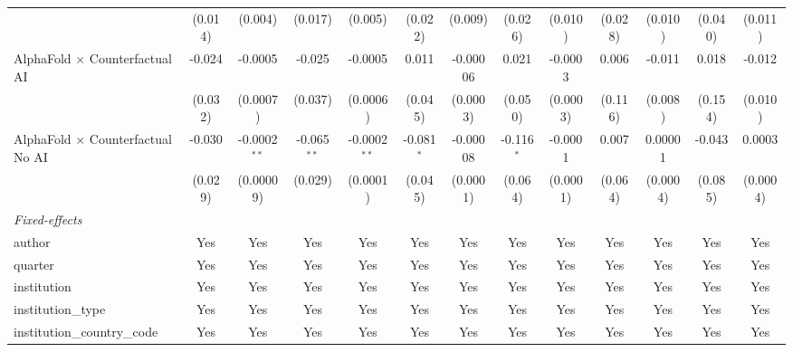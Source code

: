 \begin{tabular}{lcccccccccccc}
                                            & (0.014)       & (0.004)        & (0.017)       & (0.005)        & (0.022)       & (0.009)       & (0.026)       & (0.010)       & (0.028)      & (0.010)     & (0.040)      & (0.011)\\   
   AlphaFold $\times$ Counterfactual AI     & -0.024        & -0.0005        & -0.025        & -0.0005        & 0.011         & -0.00006      & 0.021         & -0.0003       & 0.006        & -0.011      & 0.018        & -0.012\\   
                                            & (0.032)       & (0.0007)       & (0.037)       & (0.0006)       & (0.045)       & (0.0003)      & (0.050)       & (0.0003)      & (0.116)      & (0.008)     & (0.154)      & (0.010)\\   
   AlphaFold $\times$ Counterfactual No AI  & -0.030        & -0.0002$^{**}$ & -0.065$^{**}$ & -0.0002$^{**}$ & -0.081$^{*}$  & -0.00008      & -0.116$^{*}$  & -0.0001       & 0.007        & 0.00001     & -0.043       & 0.0003\\   
                                            & (0.029)       & (0.00009)      & (0.029)       & (0.0001)       & (0.045)       & (0.0001)      & (0.064)       & (0.0001)      & (0.064)      & (0.0004)    & (0.085)      & (0.0004)\\   
   \midrule
   \emph{Fixed-effects}\\
   author                                   & Yes           & Yes            & Yes           & Yes            & Yes           & Yes           & Yes           & Yes           & Yes          & Yes         & Yes          & Yes\\  
   quarter                                  & Yes           & Yes            & Yes           & Yes            & Yes           & Yes           & Yes           & Yes           & Yes          & Yes         & Yes          & Yes\\  
   institution                              & Yes           & Yes            & Yes           & Yes            & Yes           & Yes           & Yes           & Yes           & Yes          & Yes         & Yes          & Yes\\  
   institution\_type                        & Yes           & Yes            & Yes           & Yes            & Yes           & Yes           & Yes           & Yes           & Yes          & Yes         & Yes          & Yes\\  
   institution\_country\_code               & Yes           & Yes            & Yes           & Yes            & Yes           & Yes           & Yes           & Yes           & Yes          & Yes         & Yes          & Yes\\  

\end{tabular}
